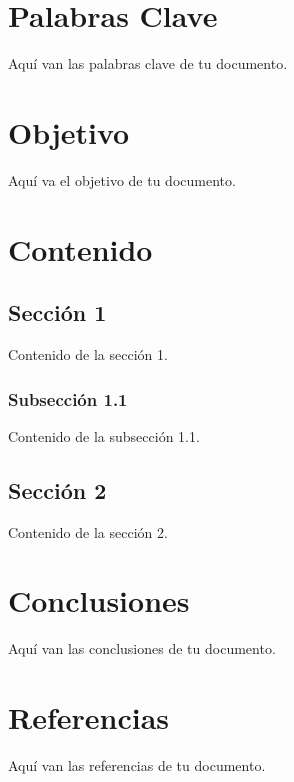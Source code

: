 \documentclass[12pt]{report}
\begin{document}
\chapter*{Palabras Clave}
Aquí van las palabras clave de tu documento.
\newpage

\chapter*{Objetivo}
Aquí va el objetivo de tu documento.
\newpage

\chapter{Contenido}
\section{Sección 1}
Contenido de la sección 1.

\subsection{Subsección 1.1}
Contenido de la subsección 1.1.

\section{Sección 2}
Contenido de la sección 2.
\newpage

\chapter{Conclusiones}
Aquí van las conclusiones de tu documento.
\newpage

\chapter{Referencias}
Aquí van las referencias de tu documento.
\end{document}

